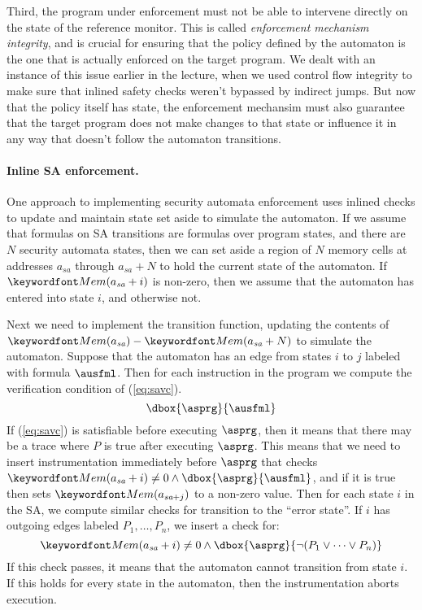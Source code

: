 \documentclass[11pt,twoside]{scrartcl}
\begin{document}
Third, the program under enforcement must not be able to intervene directly on the state of the reference monitor. This is called \emph{enforcement mechanism integrity}, and is crucial for ensuring that the policy defined by the automaton is the one that is actually enforced on the target program. We dealt with an instance of this issue earlier in the lecture, when we used control flow integrity to make sure that inlined safety checks weren't bypassed by indirect jumps. But now that the policy itself has state, the enforcement mechansim must also guarantee that the target program does not make changes to that state or influence it in any way that doesn't follow the automaton transitions.

\paragraph{Inline SA enforcement.} One approach to implementing security automata enforcement uses inlined checks to update and maintain state set aside to simulate the automaton. If we assume that formulas on SA transitions are formulas over program states, and there are $N$ security automata states, then we can set aside a region of $N$ memory cells at addresses $a_{\textit{sa}}$ through $a_{\textit{sa}}+N$ to hold the current state of the automaton. If $\pderef{a_{\textit{sa}}+i}$ is non-zero, then we assume that the automaton has entered into state $i$, and otherwise not.

Next we need to implement the transition function, updating the contents of $\pderef{a_{\textit{sa}}} - \pderef{a_{\textit{sa}}+N}$ to simulate the automaton. Suppose that the automaton has an edge from states $i$ to $j$ labeled with formula $\ausfml$. Then for each instruction in the program we compute the verification condition of (\ref{eq:savc}).
\begin{equation}
\label{eq:savc}
\dbox{\asprg}{\ausfml}
\end{equation}
If (\ref{eq:savc}) is satisfiable before executing $\asprg$, then it means that there may be a trace where $P$ is true after executing $\asprg$. This means that we need to insert instrumentation immediately before $\asprg$ that checks $\pderef{a_{\textit{sa}}+i} \ne 0 \land \dbox{\asprg}{\ausfml}$, and if it is true then sets $\pderef{a_{\textit{sa}+j}}$ to a non-zero value. Then for each state $i$ in the SA, we compute similar checks for transition to the ``error state''. If $i$ has outgoing edges labeled $P_1, \ldots, P_n$, we insert a check for:
\begin{equation}
\pderef{a_{\textit{sa}}+i} \ne 0 \land \dbox{\asprg}{\lnot(P_1 \lor \cdots \lor P_n)}
\end{equation}
If this check passes, it means that the automaton cannot transition from state $i$. If this holds for every state in the automaton, then the instrumentation aborts execution.
\end{document}

